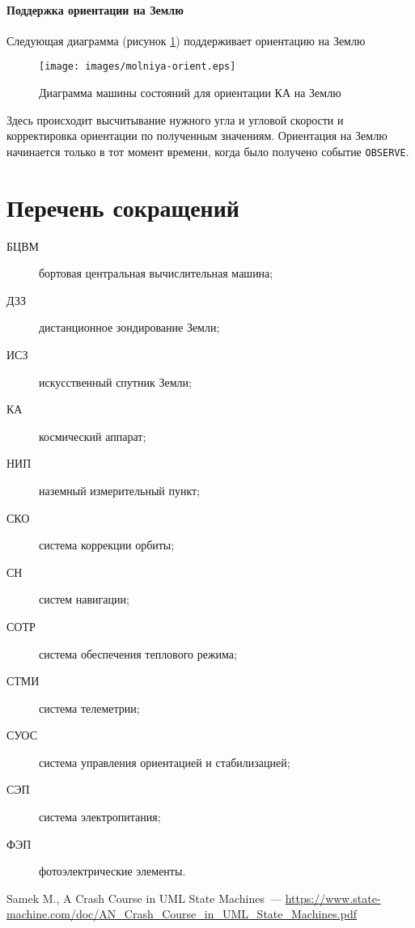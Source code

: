 \documentclass[12pt,a4paper]{article}
\begin{document}
\paragraph{Поддержка ориентации на Землю} Следующая диаграмма (рисунок \ref{Pic:Molniya-orient}) поддерживает ориентацию на Землю

\begin{figure}[tbh]
  \begin{center}
    \texttt{[image: images/molniya-orient.eps]}
    \caption{Диаграмма машины состояний для ориентации КА на Землю}
    \label{Pic:Molniya-orient}
  \end{center}
\end{figure}

Здесь происходит высчитывание нужного угла и угловой скорости и корректировка ориентации по полученным значениям.
Ориентация на Землю начинается только в тот момент времени, когда было получено событие \verb'OBSERVE'.
   
\section*{Перечень сокращений}

\begin{description}
\item[БЦВМ] бортовая центральная вычислительная машина;
\item[ДЗЗ] дистанционное зондирование Земли;
\item[ИСЗ] искусственный спутник Земли;
\item[КА] космический аппарат;
\item[НИП] наземный измерительный пункт;
\item[СКО] система коррекции орбиты;
\item[СН] систем навигации;
\item[СОТР] система обеспечения теплового режима;
\item[СТМИ] система телеметрии;
\item[СУОС] система управления ориентацией и стабилизацией;
\item[СЭП] система электропитания;
\item[ФЭП] фотоэлектрические элементы.
\end{description}

\begin{thebibliography}{2}
 Samek M., A Crash Course in UML State Machines~---
  \url{https://www.state-machine.com/doc/AN_Crash_Course_in_UML_State_Machines.pdf}
\end{thebibliography}
\end{document}
